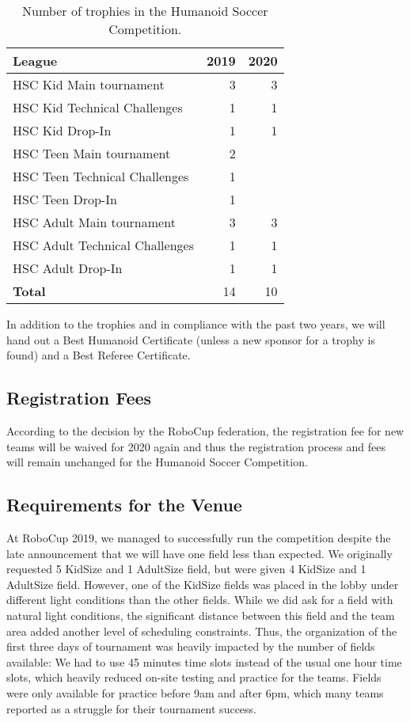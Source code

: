 \documentclass{article}
\begin{document}
\begin{table}[h]
  \centering
  \begin{tabular}{l | r | r}
    League & 2019 & 2020\\
    \hline
    HSC Kid Main tournament & 3 & 3\\ 
    HSC Kid Technical Challenges & 1 & 1\\
    HSC Kid Drop-In & 1 & 1\\
    HSC Teen Main tournament & 2 & \\ 
    HSC Teen Technical Challenges & 1 & \\
    HSC Teen Drop-In & 1 & \\
    HSC Adult Main tournament & 3 & 3\\ 
    HSC Adult Technical Challenges & 1 & 1\\
    HSC Adult Drop-In & 1 & 1\\
    \hline
    \textbf{Total} & 14 & 10
  \end{tabular}
  \caption{Number of trophies in the Humanoid Soccer Competition.}

\end{table}

In addition to the trophies and in compliance with the past two years, we will hand out a Best Humanoid Certificate (unless a new sponsor for a trophy is found) and a Best Referee Certificate.

\subsection{Registration Fees}
According to the decision by the RoboCup federation, the registration fee for new teams will be waived for 2020 again and thus the registration process and fees will remain unchanged for the Humanoid Soccer Competition.

\subsection{Requirements for the Venue}

At RoboCup 2019, we managed to successfully run the competition despite the late
announcement that we will have one field less than expected. We originally requested 5 KidSize and 1 AdultSize field, but were given 4 KidSize and 1 AdultSize field. However, one of the KidSize fields was placed in the lobby under different light conditions than the other fields. While we did ask for a field with natural light conditions, the significant distance between this field and the team area added another level of scheduling constraints. Thus, the organization of the first three days of tournament was heavily impacted by the number of fields available: We had to use 45 minutes time slots instead of the usual one hour time slots, which heavily reduced on-site testing and practice for the teams. Fields were only available for practice before 9am and after 6pm, which many teams reported as a struggle for their tournament success. 
\end{document}
